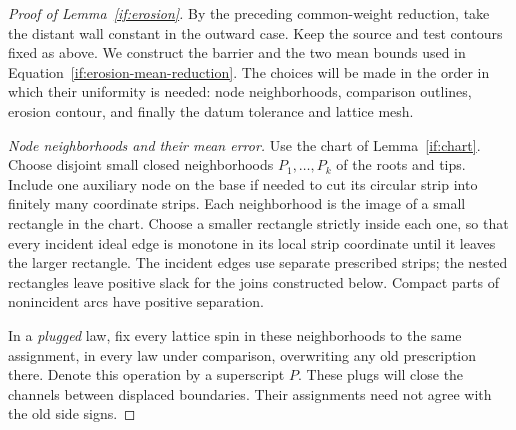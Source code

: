 \documentclass[11pt]{article}
\theoremstyle{definition}
\theoremstyle{remark}
\numberwithin{equation}{section}
\begin{document}
\begin{proof}[Proof of Lemma~\ref{if:erosion}]
By the preceding common-weight reduction, take the distant wall
constant in the outward case. Keep the source and test contours fixed
as above. We construct the barrier and the two mean bounds used in
Equation~\eqref{if:erosion-mean-reduction}. The choices will be made in
the order in which their uniformity is needed: node neighborhoods,
comparison outlines, erosion contour, and finally the datum tolerance
and lattice mesh.

\emph{Node neighborhoods and their mean error.}
Use the chart of Lemma~\ref{if:chart}. Choose disjoint small closed
neighborhoods $P_1,\ldots,P_k$ of the roots and tips. Include one
auxiliary node on the base if needed to cut its circular strip into
finitely many coordinate strips. Each neighborhood is the image of
a small rectangle in the chart. Choose a smaller rectangle strictly
inside each one, so that every incident ideal edge is monotone in
its local strip coordinate until it leaves the larger rectangle.
The incident edges use separate prescribed strips; the nested
rectangles leave positive slack for the joins constructed below.
Compact parts of nonincident arcs have positive separation.

In a \emph{plugged} law, fix every lattice spin in these neighborhoods
to the same assignment, in every law under comparison, overwriting
any old prescription there. Denote this operation by a superscript
$P$. These plugs will close the channels between displaced boundaries.
Their assignments need not agree with the old side signs.


\end{proof}
\end{document}
